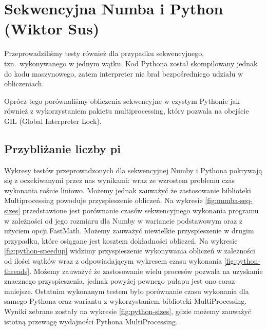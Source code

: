 \section{Sekwencyjna Numba i Python (Wiktor Sus)}
Przeprowadziliśmy testy również dla przypadku sekwencyjnego, tzn.\ wykonywanego w jednym wątku.
Kod Pythona został skompilowany jednak do kodu maszynowego, zatem interpreter nie brał bezpośredniego udziału w obliczeniach.

Oprócz tego porównaliśmy obliczenia sekwencyjne w czystym Pythonie jak również z wykorzystaniem pakietu multiprocessing,
który pozwala na obejście GIL (Global Interpreter Lock).

\subsection{Przybliżanie liczby pi}
Wykresy testów przeprowadzonych dla sekwencyjnej Numby i Pythona pokrywają się z oczekiwanymi przez nas wynikami: wraz ze wzrostem problemu czas wykonania rośnie liniowo.
Możemy jednak zauważyć że zastosowanie biblioteki Multiprocessing powoduje przyspieszenie obliczeń.
Na wykresie \ref{fig:numba-seq-sizes} przedstawione jest porównanie czasów sekwencyjnego wykonania programu w zależności od jego rozmiaru dla Numby w wariancie podstawowym oraz z użyciem opcji FastMath.
Możemy zauważyć niewielkie przyspieszenie w drugim przypadku, które osiągane jest kosztem dokładności obliczeń.
Na wykresie \ref{fig:python-speedup} widzimy przyspieszenie wykonywania obliczeń w zależności od ilości wątków wraz z odpowiadającym wykresem czasu wykonania \ref{fig:python-threads}.
Możemy zauważyć że zastosowanie wielu procesów pozwala na uzyskanie znacznego przyspieszenia, jednak powyżej pewnego pułapu jest ono coraz mniejsze.
Ostatnim wykonanym testem było porównanie czasu wykonania dla samego Pythona oraz wariantu z wykorzystaniem biblioteki MultiProcessing.
Wyniki zebrane zostały na wykresie \ref{fig:python-sizes}, gdzie możemy zauważyć istotną przewagę wydajności Pythona MultiProcessing.


\begin{figure*}
    \centering
    
    \caption{Czas sekwencyjnego wykonania algorytmu w Numbie w zależności od rozmiaru problemu}
    \label{fig:numba-seq-sizes}
\end{figure*}

\begin{figure*}
    \centering
    \begin{minipage}[b]{.45\textwidth}
        \centering
        
        \caption{Przyspieszenie liczenia liczby $\pi$ w czystym Pythonie}
        \label{fig:python-speedup}
    \end{minipage}
    \hfill
    \begin{minipage}[b]{.45\textwidth}
        \centering
        
        \caption{Czas wykonania algorytmu w czystym Pythonie w zależności od liczby wątków}
        \label{fig:python-threads}
    \end{minipage}
\end{figure*}

\begin{figure*}
    \centering
    
    \caption{Czas wykonania algorytmu w czystym Pythonie i Pythonie MP w zależności od rozmiaru problemu}
    \label{fig:python-sizes}
\end{figure*}
